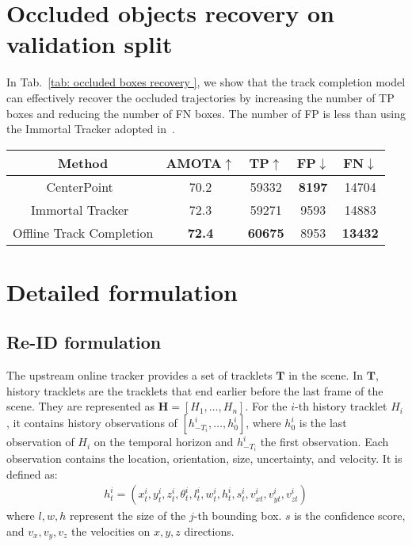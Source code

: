 \documentclass{article} \usepackage{iclr2023_conference,times}
\begin{document}
\section{Occluded objects recovery on validation split}
\label{sec: occluded boxes recovery}
In Tab.~\ref{tab: occluded boxes recovery }, we show that the track completion model can effectively recover the occluded trajectories by increasing the number of TP boxes and reducing the number of FN boxes. The number of FP is less than using the Immortal Tracker adopted in~\cite{Detzero, CTRL}.
\vspace{-3mm}
\begin{table*}[h]
\centering
\begin{tabular}{c|cccc}
\textbf{Method}                   & \textbf{AMOTA$\uparrow$}         & \textbf{TP$\uparrow$}             & \textbf{FP$\downarrow$}            & \textbf{FN$\downarrow$}             \\ \hline
CenterPoint~\cite{Centerpoint}              & 70.2          & 59332          & \textbf{8197} & 14704          \\
Immortal Tracker~\cite{Immortaltrackers}                & 72.3          & 59271          & 9593          & 14883          \\ \hline 
Offline Track Completion & \textbf{72.4} & \textbf{60675} & 8953          & \textbf{13432}
\end{tabular}
\caption{Our track completion model can effectively recover the occluded objects by increasing TP (All-boxes setup). }
\label{tab: occluded boxes recovery }
\end{table*}

\section{Detailed formulation}
\label{sec: Formulation}
\subsection{Re-ID formulation}
\label{sec: Re-ID formulation}
The upstream online tracker provides a set of tracklets $\mathbf{T}$ in the scene. In $\mathbf{T}$, history tracklets are the tracklets that end earlier before the last frame of the scene. They are represented as $\mathbf{H}=\left[H_{1}, \ldots, H_{n}\right]$. For the $i$-th history tracklet $H_{i}$, it contains history observations of $\left[ h^{i}_{-T_i}, \ldots, h^{i}_{0}\right]$, where $h^{i}_{0}$ is the last observation of $H_{i}$ on the temporal horizon and $h^{i}_{-T_i}$ the first observation. Each observation contains the location, orientation, size, uncertainty, and velocity. It is defined as:
\begin{equation}\label{eq:observation formulation}
\begin{aligned}
    h^{i}_t=\left(x^{i}_{t}, y^{i}_{t}, z^{i}_{t}, \theta^{i}_{t}, l^{i}_{t}, w^{i}_{t}, h^{i}_{t}, s^{i}_{t}, v_{xt}^{i}, v_{yt}^{i}, v_{zt}^{i}\right)
\end{aligned}
\end{equation}
where $l,w,h$ represent the size of the $j$-th bounding box. $s$ is the confidence score, and $v_x, v_y, v_z$ the velocities on $x,y,z$ directions.
\end{document}
